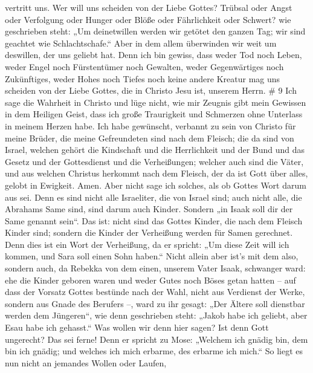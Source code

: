 vertritt uns.  Wer will uns scheiden von der Liebe Gottes?
Trübsal oder Angst oder Verfolgung oder Hunger oder Blöße oder
Fährlichkeit oder Schwert?  wie geschrieben steht: „Um
deinetwillen werden wir getötet den ganzen Tag; wir sind geachtet wie
Schlachtschafe.``  Aber in dem allem überwinden wir weit um
deswillen, der uns geliebt hat.  Denn ich bin gewiss, dass
weder Tod noch Leben, weder Engel noch Fürstentümer noch Gewalten, weder
Gegenwärtiges noch Zukünftiges,  weder Hohes noch Tiefes
noch keine andere Kreatur mag uns scheiden von der Liebe Gottes, die in
Christo Jesu ist, unserem Herrn. \# 9  Ich sage die Wahrheit
in Christo und lüge nicht, wie mir Zeugnis gibt mein Gewissen in dem
Heiligen Geist,  dass ich große Traurigkeit und Schmerzen
ohne Unterlass in meinem Herzen habe.  Ich habe gewünscht,
verbannt zu sein von Christo für meine Brüder, die meine Gefreundeten
sind nach dem Fleisch;  die da sind von Israel, welchen
gehört die Kindschaft und die Herrlichkeit und der Bund und das Gesetz
und der Gottesdienst und die Verheißungen;  welcher auch
sind die Väter, und aus welchen Christus herkommt nach dem Fleisch, der
da ist Gott über alles, gelobt in Ewigkeit. Amen.  Aber
nicht sage ich solches, als ob Gottes Wort darum aus sei. Denn es sind
nicht alle Israeliter, die von Israel sind;  auch nicht
alle, die Abrahams Same sind, sind darum auch Kinder. Sondern „in Isaak
soll dir der Same genannt sein``.  Das ist: nicht sind das
Gottes Kinder, die nach dem Fleisch Kinder sind; sondern die Kinder der
Verheißung werden für Samen gerechnet.  Denn dies ist ein
Wort der Verheißung, da er spricht: „Um diese Zeit will ich kommen, und
Sara soll einen Sohn haben.``  Nicht allein aber ist's mit
dem also, sondern auch, da Rebekka von dem einen, unserem Vater Isaak,
schwanger ward:  ehe die Kinder geboren waren und weder
Gutes noch Böses getan hatten -- auf dass der Vorsatz Gottes bestünde
nach der Wahl,  nicht aus Verdienst der Werke, sondern aus
Gnade des Berufers --, ward zu ihr gesagt: „Der Ältere soll dienstbar
werden dem Jüngeren``,  wie denn geschrieben steht: „Jakob
habe ich geliebt, aber Esau habe ich gehasst.``  Was wollen
wir denn hier sagen? Ist denn Gott ungerecht? Das sei ferne!
 Denn er spricht zu Mose: „Welchem ich gnädig bin, dem bin
ich gnädig; und welches ich mich erbarme, des erbarme ich mich.``
 So liegt es nun nicht an jemandes Wollen oder Laufen,
